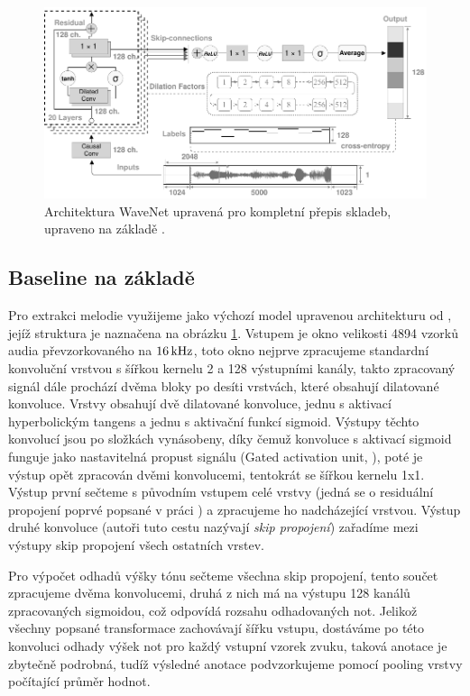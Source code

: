 \begin{figure}[h]\centering
\includegraphics[width=\textwidth,height=\textheight,keepaspectratio]{../img/wavenet_arch_grey}
\caption{Architektura WaveNet upravená pro kompletní přepis skladeb, upraveno na základě \cite{Martak2018}.}
\label{obr:wavenet_arch}
\end{figure}

\subsection{Baseline na základě \cite{Martak2018}}

Pro extrakci melodie využijeme jako výchozí model upravenou architekturu od \cite{Martak2018}, jejíž struktura je naznačena na obrázku \ref{obr:wavenet_arch}. Vstupem je okno velikosti 4894 vzorků audia převzorkovaného na $16\,\rm kHz$, toto okno nejprve zpracujeme standardní konvoluční vrstvou s šířkou kernelu 2 a 128 výstupními kanály, takto zpracovaný signál dále prochází dvěma bloky po desíti vrstvách, které obsahují dilatované konvoluce. Vrstvy obsahují dvě dilatované konvoluce, jednu s aktivací hyperbolickým tangens a jednu s aktivační funkcí sigmoid. Výstupy těchto konvolucí jsou po složkách vynásobeny, díky čemuž konvoluce s aktivací sigmoid funguje jako nastavitelná propust signálu (Gated activation unit, \cite{Oord2016a}), poté je výstup opět zpracován dvěmi konvolucemi, tentokrát se šířkou kernelu 1x1. Výstup první sečteme s původním vstupem celé vrstvy (jedná se o residuální propojení poprvé popsané v práci \cite{He2015}) a zpracujeme ho nadcházející vrstvou. Výstup druhé konvoluce (autoři tuto cestu nazývají \emph{skip propojení}) zařadíme mezi výstupy skip propojení všech ostatních vrstev.

Pro výpočet odhadů výšky tónu sečteme všechna skip propojení, tento součet zpracujeme dvěma konvolucemi, druhá z nich má na výstupu 128 kanálů zpracovaných sigmoidou, což odpovídá rozsahu odhadovaných not. Jelikož všechny popsané transformace zachovávají šířku vstupu, dostáváme po této konvoluci odhady výšek not pro každý vstupní vzorek zvuku, taková anotace je zbytečně podrobná, tudíž výsledné anotace podvzorkujeme pomocí pooling vrstvy počítající průměr hodnot.

